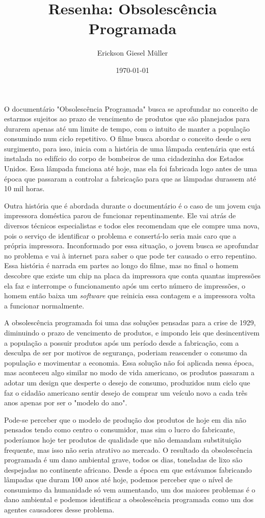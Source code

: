 \documentclass[12pt, a4paper]{article}
\title{Resenha: Obsolescência Programada}
\author{Erickson Giesel Müller}
\date{\today}
\begin{document}
\maketitle
\thispagestyle{empty} %

	O documentário "Obsolescência Programada" busca se aprofundar no conceito de estarmos sujeitos ao prazo de vencimento de produtos que são planejados para durarem apenas até um limite de tempo, com o intuito de manter a população consumindo num ciclo repetitivo. O filme busca abordar o conceito desde o seu surgimento, para isso, inicia com a história de uma lâmpada centenária que está instalada no edifício do corpo de bombeiros de uma cidadezinha dos Estados Unidos. Essa lâmpada funciona até hoje, mas ela foi fabricada logo antes de uma época que passaram a controlar a fabricação para que as lâmpadas durassem até 10 mil horas.

	Outra história que é abordada durante o documentário é o caso de um jovem cuja impressora doméstica parou de funcionar repentinamente. Ele vai atrás de diversos técnicos especialistas e todos eles recomendam que ele compre uma nova, pois o serviço de identificar o problema e consertá-lo seria mais caro que a própria impressora. Inconformado por essa situação, o jovem busca se aprofundar no problema e vai à internet para saber o que pode ter causado o erro repentino. Essa história é narrada em partes ao longo do filme, mas no final o homem descobre que existe um chip na placa da impressora que conta quantas impressões ela faz e interrompe o funcionamento após um certo número de impressões, o homem então baixa um \textit{software} que reinicia essa contagem e a impressora volta a funcionar normalmente.

	A obsolescência programada foi uma das soluções pensadas para a crise de 1929, diminuindo o prazo de vencimento de produtos, e impondo leis que desincentivem a população a possuir produtos após um período desde a fabricação, com a desculpa de ser por motivos de segurança, poderiam reascender o consumo da população e movimentar a economia. Essa solução não foi aplicada nessa época, mas aconteceu algo similar no modo de vida americano, os produtos passaram a adotar um design que desperte o desejo de consumo, produzidos num ciclo que faz o cidadão americano sentir desejo de comprar um veículo novo a cada três anos apenas por ser o "modelo do ano".

	Pode-se perceber que o modelo de produção dos produtos de hoje em dia não pensados tendo como centro o consumidor, mas sim o lucro do fabricante, poderíamos hoje ter produtos de qualidade que não demandam substituição frequente, mas isso não seria atrativo ao mercado. O resultado da obsolescência programada é um dano ambiental grave, todos os dias, toneladas de lixo são despejadas no continente africano. Desde a época em que estávamos fabricando lâmpadas que duram 100 anos até hoje, podemos perceber que o nível de consumismo da humanidade só vem aumentando, um dos maiores problemas é o dano ambiental e podemos identificar a obsolescência programada como um dos agentes causadores desse problema.
\end{document}
